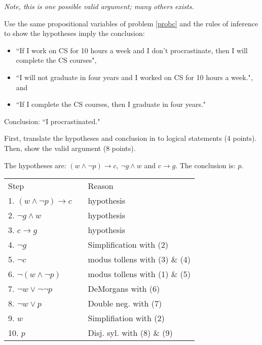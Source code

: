 \documentclass[12pt,addpoints]{exam}
\newcommand{\ra}{\rightarrow}
\begin{document}
\begin{questions}
\begin{solution}
    \emph{Note, this is one possible valid argument; many others exists.}
\end{solution}


\question[12] Use the same propositional variables of problem \ref{probc} and the rules of inference to show the hypotheses imply the conclusion:
\begin{itemize}[itemsep=0pt,parsep=0pt,topsep=0pt,partopsep=0pt]
    \item ``If I work on CS for 10 hours a week and I don't procrastinate, then I will complete the CS courses",
    \item ``I will not graduate in four years and I worked on CS for 10 hours a week.", and
    \item ``If I complete the CS courses, then I graduate in four years."
\end{itemize}
Conclusion:  ``I procrastinated."

First, translate the hypotheses and conclusion in to logical statements (4 points).  Then, show the valid argument (8 points).
    \ifprintanswers
        \vspace{-12pt}
    \fi
\begin{solution}
    The hypotheses are: $(w \wedge \neg p) \ra c$, $\neg g \wedge w$ and $c \ra g$.
    The conclusion is: $p$.

        \begin{tabular}{lll}
        Step    & \hspace{0.2in} & Reason \\
        1. $(w \wedge \neg p) \ra c$        & & hypothesis \\
        2. $\neg g \wedge w$                & & hypothesis \\
        3. $c \ra g$                     	& & hypothesis \\
        4. $\neg g$							& & Simplification with (2) \\
        5. $\neg c$							& & modus tollens with (3) \& (4) \\
        6. $\neg (w \wedge \neg p)$			& & modus tollens with (1) \& (5) \\
        7. $\neg w \vee \neg \neg p$			& & DeMorgans with (6) \\
        8. $\neg w \vee p$					& & Double neg. with (7) \\
        9.  $w$								& & Simplifiation with (2) \\
        10. $p$								& & Disj. syl. with (8) \& (9) \\
        \end{tabular}
\end{solution}
    		

\end{questions}
\end{document}
